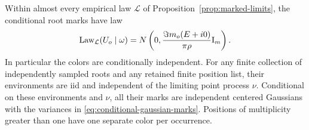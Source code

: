 \begin{proposition}\label{prop:gaussian-marks}
Within almost every empirical law \(\mathcal L\) of
Proposition~\ref{prop:marked-limits}, the conditional root marks
have law
\begin{equation}\label{eq:conditional-gaussian-marks}
 \operatorname{Law}_{\mathcal L}(U_o\mid\omega)
 =N\left(0,\frac{\Im m_o(E+i0)}{\pi\rho}\mathrm I_m\right).
\end{equation}
In particular the colors are conditionally independent.
For any finite collection of independently sampled roots and
any retained finite position list, their environments are iid
and independent of the limiting point process \(\nu\).
Conditional on these environments and \(\nu\), all their marks
are independent centered Gaussians with the variances in
\eqref{eq:conditional-gaussian-marks}.  Positions of multiplicity
greater than one have one separate color per occurrence.
\end{proposition}

